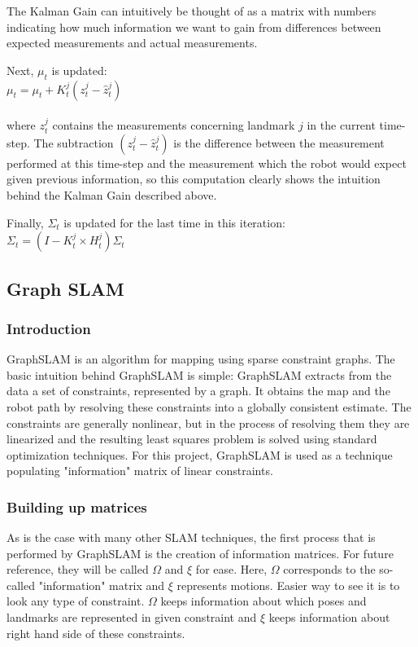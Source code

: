 \documentclass{ba-kecs}
\numberwithin{figure}{section}
\numberwithin{equation}{section}
\begin{document}
The Kalman Gain can intuitively be thought of as a matrix with numbers indicating how much information we want to gain from differences between expected measurements and actual measurements. 

Next, $\mu_t$ is updated: \\

$\mu_t = \mu_t + K_t^j(z_t^j - \hat{z}_t^j)$ \\ \\
where $z_t^j$ contains the measurements concerning landmark $j$ in the current time-step. The subtraction $(z_t^j - \hat{z}_t^j)$ is the difference between the measurement performed at this time-step and the measurement which the robot would expect given previous information, so this computation clearly shows the intuition behind the Kalman Gain described above.

Finally, $\Sigma_t$ is updated for the last time in this iteration: \\

$\Sigma_t = (I - K_t^j \times H_t^j) \Sigma_t$


\subsection{Graph SLAM}

\subsubsection{Introduction}
GraphSLAM is an algorithm for mapping using sparse constraint graphs. The basic intuition behind GraphSLAM is simple: GraphSLAM extracts from the data a set of constraints, represented by a graph. It obtains the map and the robot path by resolving these constraints into a globally consistent estimate. The constraints are generally nonlinear, but in the process of resolving them they are linearized and the resulting least squares problem is solved using standard optimization techniques\cite{sik}. For this project, GraphSLAM is used as a technique populating "information" matrix of linear constraints.

\subsubsection{Building up matrices}
As is the case with many other SLAM techniques, the first process that is performed by GraphSLAM is the creation of information matrices. For future reference, they will be called $\Omega$ and $\xi$ for ease. Here, $\Omega$ corresponds to the so-called "information" matrix and $\xi$ represents motions. Easier way to see it is to look any type of constraint. $\Omega$ keeps information about which poses and landmarks are represented in given constraint and $\xi$ keeps information about right hand side of these constraints.
	
\end{document}
